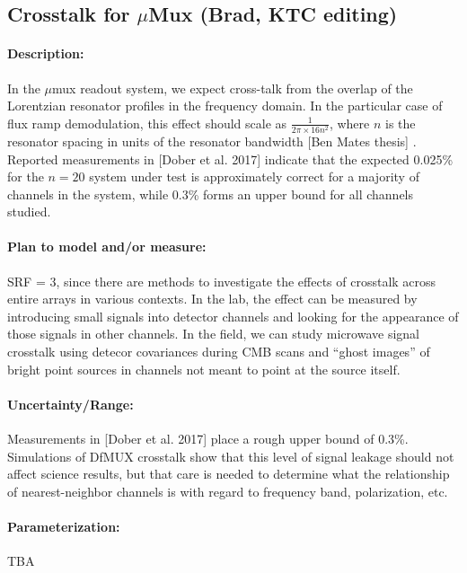 \subsection{Crosstalk for $\mu$Mux (Brad, KTC editing)}

\paragraph{Description:}
In the $\mu$mux readout system, we expect cross-talk from the overlap of the Lorentzian resonator profiles in the frequency domain. In the particular case of flux ramp demodulation, this effect should scale as $\frac{1}{2 \pi \times 16 n^2}$, where $n$ is the resonator spacing in units of the resonator bandwidth [Ben Mates thesis] \cite{Mates_thesis}. Reported measurements in [Dober et al. 2017] indicate that the expected 0.025\% for the $n = 20$ system under test is approximately correct for a majority of channels in the system, while 0.3\% forms an upper bound for all channels studied.

\paragraph{Plan to model and/or measure:}
SRF = 3, since there are methods to investigate the effects of crosstalk across entire arrays in various contexts. In the lab, the effect can be measured by introducing small signals into detector channels and looking for the appearance of those signals in other channels. In the field, we can study microwave signal crosstalk using detecor covariances during CMB scans and ``ghost images'' of bright point sources in channels not meant to point at the source itself.

\paragraph{Uncertainty/Range:}
Measurements in [Dober et al. 2017] place a rough upper bound of 0.3\%. Simulations of DfMUX crosstalk show that this level of signal leakage should not affect science results, but that care is needed to determine what the relationship of nearest-neighbor channels is with regard to frequency band, polarization, etc.

\paragraph{Parameterization:}
TBA
